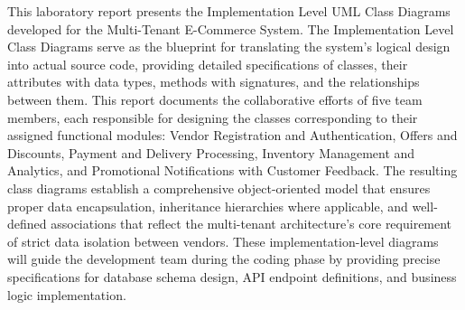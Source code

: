 This laboratory report presents the Implementation Level UML Class Diagrams developed for the Multi-Tenant E-Commerce System. The Implementation Level Class Diagrams serve as the blueprint for translating the system's logical design into actual source code, providing detailed specifications of classes, their attributes with data types, methods with signatures, and the relationships between them. This report documents the collaborative efforts of five team members, each responsible for designing the classes corresponding to their assigned functional modules: Vendor Registration and Authentication, Offers and Discounts, Payment and Delivery Processing, Inventory Management and Analytics, and Promotional Notifications with Customer Feedback. The resulting class diagrams establish a comprehensive object-oriented model that ensures proper data encapsulation, inheritance hierarchies where applicable, and well-defined associations that reflect the multi-tenant architecture's core requirement of strict data isolation between vendors. These implementation-level diagrams will guide the development team during the coding phase by providing precise specifications for database schema design, API endpoint definitions, and business logic implementation.
\endinput
